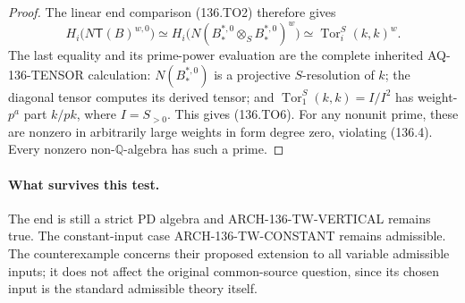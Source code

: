\begin{proof}
The linear end comparison (136.TO2) therefore gives
\[
 H_i\bigl(N\mathsf T(B)^{w,0}\bigr)
       \simeq H_i\bigl(N(B_*^{*,0}\otimes_S B_*^{*,0})^w\bigr)
       \simeq\operatorname{Tor}_i^S(k,k)^w.              \tag{136.TO7}
\]
The last equality and its prime-power evaluation are
the complete inherited AQ-136-TENSOR calculation:
$N(B_*^{*,0})$ is a projective $S$-resolution of $k$;
the diagonal tensor computes its derived tensor; and
$\operatorname{Tor}_1^S(k,k)=I/I^2$ has weight-$p^a$
part $k/pk$, where $I=S_{>0}$. This gives (136.TO6).
For any nonunit prime, these are nonzero in arbitrarily
large weights in form degree zero, violating (136.4).
Every nonzero non-$\mathbb Q$-algebra has such a prime.
\end{proof}

\paragraph{What survives this test.}
The end is still a strict PD algebra and
ARCH-136-TW-VERTICAL remains true. The constant-input
case ARCH-136-TW-CONSTANT remains admissible. The
counterexample concerns their proposed extension to
all variable admissible inputs; it does not affect
the original common-source question, since its
chosen input is the standard admissible theory itself.
